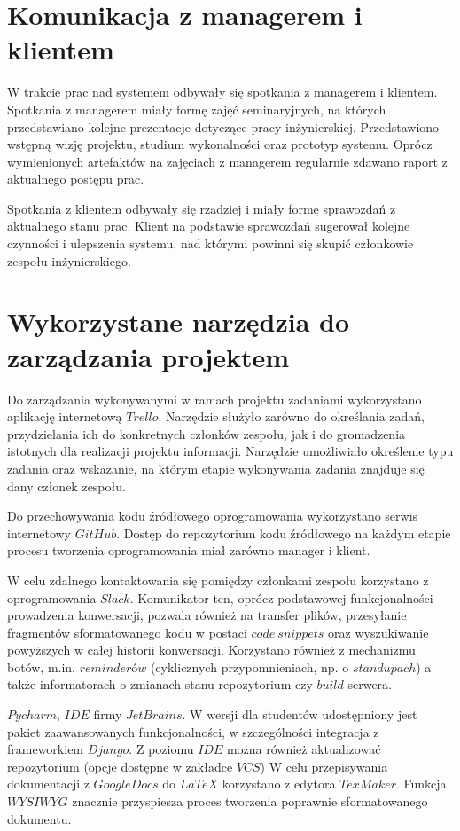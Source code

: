 \documentclass[pdflatex,11pt]{../aghdoc_version2}
\newlength\tindent
\renewcommand{\indent}{\hspace*{\tindent}}
\begin{document}
\section{Komunikacja z managerem i klientem}
W trakcie prac nad systemem odbywały się spotkania z managerem i klientem. Spotkania z
managerem miały formę zajęć seminaryjnych, na których przedstawiano kolejne prezentacje
dotyczące pracy inżynierskiej. Przedstawiono wstępną wizję projektu, studium wykonalności
oraz prototyp systemu. Oprócz wymienionych artefaktów na zajęciach z managerem
regularnie zdawano raport z aktualnego postępu prac.

Spotkania z klientem odbywały się rzadziej i miały formę sprawozdań z aktualnego stanu
prac. Klient na podstawie sprawozdań sugerował kolejne czynności i ulepszenia systemu,
nad którymi powinni się skupić członkowie zespołu inżynierskiego.

\section{Wykorzystane narzędzia do zarządzania projektem}
Do zarządzania wykonywanymi w ramach projektu zadaniami wykorzystano aplikację
internetową $Trello$. Narzędzie służyło zarówno do określania zadań, przydzielania ich do
konkretnych członków zespołu, jak i do gromadzenia istotnych dla realizacji projektu
informacji. Narzędzie umożliwiało określenie typu zadania oraz wskazanie, na którym etapie
wykonywania zadania znajduje się dany członek zespołu.

\indent Do przechowywania kodu źródłowego oprogramowania wykorzystano serwis internetowy
$GitHub$. Dostęp do repozytorium kodu źródłowego na każdym etapie procesu tworzenia
oprogramowania miał zarówno manager i klient. 

\indent W celu zdalnego kontaktowania się pomiędzy członkami zespołu korzystano z
oprogramowania $Slack$. Komunikator ten, oprócz podstawowej funkcjonalności prowadzenia
konwersacji, pozwala również na transfer plików, przesyłanie fragmentów sformatowanego
kodu w postaci $code \ snippets$ oraz wyszukiwanie powyższych w całej historii konwersacji.
Korzystano również z mechanizmu botów, m.in. $reminderów$ (cyklicznych przypomnieniach,
np. o $standupach$) a także informatorach o zmianach stanu repozytorium czy $build$ serwera.

\indent $Pycharm$, $IDE$ firmy $JetBrains$. W wersji dla studentów udostępniony jest pakiet
zaawansowanych funkcjonalności, w szczególności integracja z frameworkiem $Django$. Z
poziomu $IDE$ można również aktualizować repozytorium (opcje dostępne w zakładce $VCS$)
W celu przepisywania dokumentacji z $Google Docs$ do $LaTeX$ korzystano z edytora
$TexMaker$. Funkcja $WYSIWYG$ znacznie przyspiesza proces tworzenia poprawnie
sformatowanego dokumentu.
\end{document}
